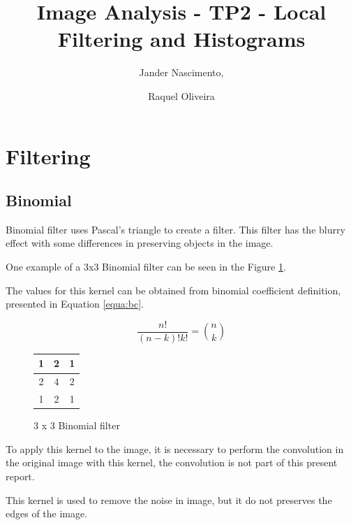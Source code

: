 \documentclass{article}
\begin{document}
\title{Image Analysis - TP2 - Local Filtering and Histograms}

\author{Jander Nascimento, 
\and Raquel Oliveira}

\maketitle

\section{Filtering}
	
	\subsection{Binomial}

		Binomial filter uses Pascal's triangle to create a filter. This filter has the blurry effect with some differences in preserving objects in the image.

One example of a 3x3 Binomial filter can be seen in the Figure \ref{3x3binomial}.

The values for this kernel can be obtained from binomial coefficient definition, presented in Equation \ref{equa:bc}.

\begin{equation}
\frac{n!}{(n-k)!k!}={n \choose k}
\label{equa:bc}
\end{equation}

\begin{figure}[H]
  \begin{center}
  \begin{tabular}{ | c | c | c | }
    \hline
    1 & 2 & 1 \\ \hline

    2 & 4 & 2 \\ \hline

    1 & 2 & 1 \\
    \hline
  \end{tabular}
  \end{center}
  \caption{3 x 3 Binomial filter\label{3x3binomial}}\end{figure}

		To apply this kernel to the image, it is necessary to perform the convolution in the original image with this kernel, the convolution is not part of this present report.

		This kernel is used to remove the noise in image, but it do not preserves the edges of the image. 
		
\end{document}
